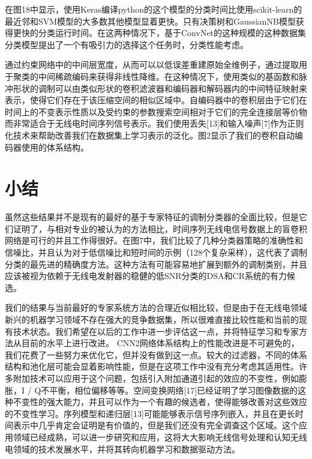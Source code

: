 在图18中显示，使用Keras编译python的这个模型的分类时间比使用scikit-learn的最近邻和SVM模型的大多数其他模型显着更快。只有决策树和GaussianNB模型获得更快的分类运行时间。在这两种情况下，基于ConvNet的这种规模的这种数据集分类模型提出了一个有吸引力的选择这个任务时，分类性能考虑。\par


通过约束网络中的中间层宽度，从而可以以低误差重建原始全维例子，通过提取用于聚类的中间稀疏编码来获得非线性降维。在这种情况下，使用类似的基函数和脉冲形状的调制可以由类似形状的卷积滤波器和编码器和解码器内的中间特征映射来表示，使得它们存在于该压缩空间的相似区域中。自编码器中的卷积层由于它们在时间上的不变表示性质以及受约束的参数搜索空间相对于它们的完全连接层等价物而非常适合于无线电时间序列信号表示。我们使用丢失[13]和输入噪声[7]作为正则化技术来帮助改善我们在数据集上学习表示的泛化。图2显示了我们的卷积自动编码器使用的体系结构。\par

\section{小结}

虽然这些结果并不是现有的最好的基于专家特征的调制分类器的全面比较，但是它们证明了，与相对专业的被认为的方法相比，时间序列无线电信号数据上的盲卷积网络是可行的并且工作得很好。在图7中，我们比较了几种分类器策略的准确性和信噪比，并且认为对于低信噪比和短时间的示例（128个复杂采样），这代表了调制分类的最先进的精确度方法。这种方法有可能容易地扩展到额外的调制类别，并且应该被视为依赖于无线电发射器的稳健的低SNR分类的DSA和CR系统的有力候选。\par

我们的结果与当前最好的专家系统方法的合理近似相比较，但是由于在无线电领域新兴的机器学习领域不存在强大的竞争数据集，所以很难直接比较性能和当前的现有技术状态。我们希望在以后的工作中进一步评估这一点，并将特征学习和专家方法从目前的水平上进行改进。 CNN2网络体系结构上的性能改进是不可避免的，我们花费了一些努力来优化它，但并没有做到这一点。较大的过滤器，不同的体系结构和池化层可能会显着影响性能，但是在这项工作中没有充分考虑其适用性。许多附加技术可以应用于这个问题，包括引入附加通道引起的效应的不变性，例如膨胀，I / Q不平衡，相位偏移等等。空间变换网络[17]已经证明了学习图像数据的这种不变性的强大能力，并且可以作为一个有趣的候选者，使得能够改善对这些效应的不变性学习。序列模型和递归层[13]可能能够表示信号序列嵌入，并且在更长时间表示中几乎肯定会证明是有价值的，但是我们还没有完全调查这个区域。这个应用领域已经成熟，可以进一步研究和应用，这将大大影响无线信号处理和认知无线电领域的技术发展水平，并将其转向机器学习和数据驱动方法。\par

